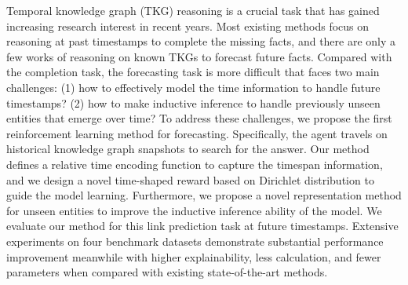 Temporal knowledge graph (TKG) reasoning is a crucial task that has gained increasing research interest in recent years. Most existing methods focus on reasoning at past timestamps to complete the missing facts, and there are only a few works of reasoning on known TKGs to forecast future facts. Compared with the completion task, the forecasting task is more difficult that faces two main challenges: (1) how to effectively model the time information to handle future timestamps? (2) how to make inductive inference to handle previously unseen entities that emerge over time? To address these challenges, we propose the first reinforcement learning method for forecasting. Specifically, the agent travels on historical knowledge graph snapshots to search for the answer. Our method defines a relative time encoding function to capture the timespan information, and we design a novel time-shaped reward based on Dirichlet distribution to guide the model learning. Furthermore, we propose a novel representation method for unseen entities to improve the inductive inference ability of the model. We evaluate our method for this link prediction task at future timestamps. Extensive experiments on four benchmark datasets demonstrate substantial performance improvement meanwhile with higher explainability, less calculation, and fewer parameters when compared with existing state-of-the-art methods.
